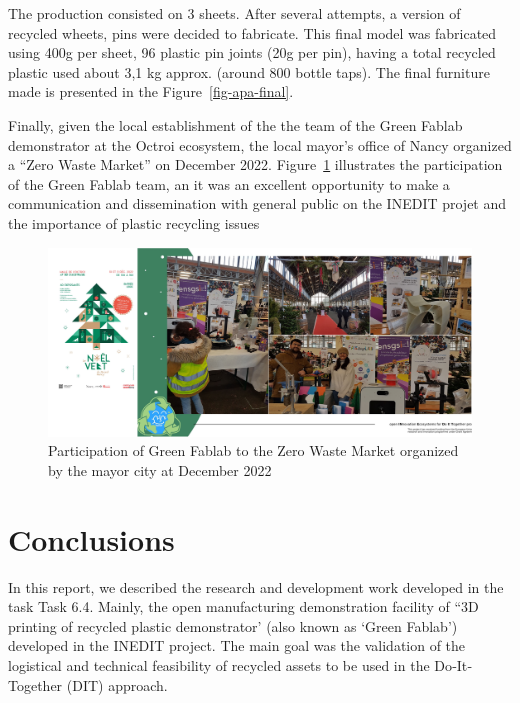 \documentclass[
  11pt,
]{article}
\begin{document}
The production consisted on 3 sheets. After several attempts, a version
of recycled wheets, pins were decided to fabricate. This final model was
fabricated using 400g per sheet, 96 plastic pin joints (20g per pin),
having a total recycled plastic used about 3,1 kg approx. (around 800
bottle taps). The final furniture made is presented in the
Figure~\ref{fig-apa-final}.

\newpage

Finally, given the local establishment of the the team of the Green
Fablab demonstrator at the Octroi ecosystem, the local mayor's office of
Nancy organized a ``Zero Waste Market'' on December 2022.
Figure~\ref{fig-zero} illustrates the participation of the Green Fablab
team, an it was an excellent opportunity to make a communication and
dissemination with general public on the INEDIT projet and the
importance of plastic recycling issues

\begin{figure}[H]

{\centering \includegraphics[width=5.20833in,height=\textheight]{figures/demos/apa/zero-dechets.jpg}

}

\caption{\label{fig-zero}Participation of Green Fablab to the Zero Waste
Market organized by the mayor city at December 2022}

\end{figure}

\newpage

\hypertarget{conclusions}{%
\section{Conclusions}\label{conclusions}}

In this report, we described the research and development work developed
in the task Task 6.4. Mainly, the open manufacturing demonstration
facility of ``3D printing of recycled plastic demonstrator' (also known
as `Green Fablab') developed in the INEDIT project. The main goal was
the validation of the logistical and technical feasibility of recycled
assets to be used in the Do‐It‐Together (DIT) approach.
\end{document}
